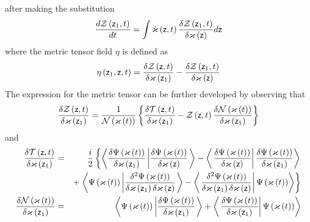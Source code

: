 after making the substitution 
\begin{equation}
\frac{d{\cal Z}\left( {\sf z}_{1},t\right) }{dt}=\int {\cal \dot{\varkappa}}%
\left( {\sf z},t\right) \frac{\delta {\cal Z}\left( {\sf z}_{1},t\right) }{%
\delta {\cal \varkappa }\left( {\sf z}\right) }d{\sf z}
\end{equation}%
where the metric tensor field $\eta $ is defined as 
\begin{equation}
\eta \left( {\sf z}_{1},{\sf z},t\right) =\frac{\delta {\cal Z}\left( {\sf z}%
,t\right) }{\delta \varkappa \left( {\sf z}_{1}\right) }-\frac{\delta {\cal Z%
}\left( {\sf z}_{1},t\right) }{\delta {\cal \varkappa }\left( {\sf z}\right) 
}
\end{equation}%
The expression for the metric tensor can be further developed by observing
that 
\begin{equation}
\frac{\delta {\cal Z}\left( {\sf z},t\right) }{\delta \varkappa \left( {\sf z%
}_{1}\right) }=\frac{1}{{\cal N}\left( {\cal \varkappa }\left( t\right)
\right) }\left\{ \frac{\delta {\cal T}\left( {\sf z},t\right) }{\delta
\varkappa \left( {\sf z}_{1}\right) }-{\cal Z}\left( {\sf z},t\right) \frac{%
\delta {\cal N}\left( \varkappa \left( t\right) \right) }{\delta \varkappa
\left( {\sf z}_{1}\right) }\right\}
\end{equation}%
and 
\begin{eqnarray}
\frac{\delta {\cal T}\left( {\sf z},t\right) }{\delta \varkappa \left( {\sf z%
}_{1}\right) } &=&\frac{i}{2}\left\{ \left\langle \frac{\delta \Psi \left( 
{\cal \varkappa }\left( t\right) \right) }{\delta {\cal \varkappa }\left( 
{\sf z}_{1}\right) }\left| \frac{\delta \Psi \left( {\cal \varkappa }\left(
t\right) \right) }{\delta {\cal \varkappa }\left( {\sf z}\right) }\right.
\right\rangle -\left\langle \left. \frac{\delta \Psi \left( {\cal \varkappa }%
\left( t\right) \right) }{\delta {\cal \varkappa }\left( {\sf z}\right) }%
\right| \frac{\delta \Psi \left( {\cal \varkappa }\left( t\right) \right) }{%
\delta {\cal \varkappa }\left( {\sf z}_{1}\right) }\right\rangle \right. 
\nonumber \\
&&+\left. \left\langle \Psi \left( {\cal \varkappa }\left( t\right) \right)
\left| \frac{\delta ^{2}\Psi \left( {\cal \varkappa }\left( t\right) \right) 
}{\delta {\cal \varkappa }\left( {\sf z}_{1}\right) \delta {\cal \varkappa }%
\left( {\sf z}\right) }\right. \right\rangle -\left\langle \left. \frac{%
\delta ^{2}\Psi \left( {\cal \varkappa }\left( t\right) \right) }{\delta 
{\cal \varkappa }\left( {\sf z}_{1}\right) \delta {\cal \varkappa }\left( 
{\sf z}\right) }\right| \Psi \left( {\cal \varkappa }\left( t\right) \right)
\right\rangle \right\} \\
\frac{\delta {\cal N}\left( \varkappa \left( t\right) \right) }{\delta
\varkappa \left( {\sf z}_{1}\right) } &=&\left\langle \Psi \left( {\cal %
\varkappa }\left( t\right) \right) \left| \frac{\delta \Psi \left( {\cal %
\varkappa }\left( t\right) \right) }{\delta {\cal \varkappa }\left( {\sf z}%
_{1}\right) }\right. \right\rangle +\left\langle \left. \frac{\delta \Psi
\left( {\cal \varkappa }\left( t\right) \right) }{\delta {\cal \varkappa }%
\left( {\sf z}_{1}\right) }\right| \Psi \left( {\cal \varkappa }\left(
t\right) \right) \right\rangle
\end{eqnarray}%
